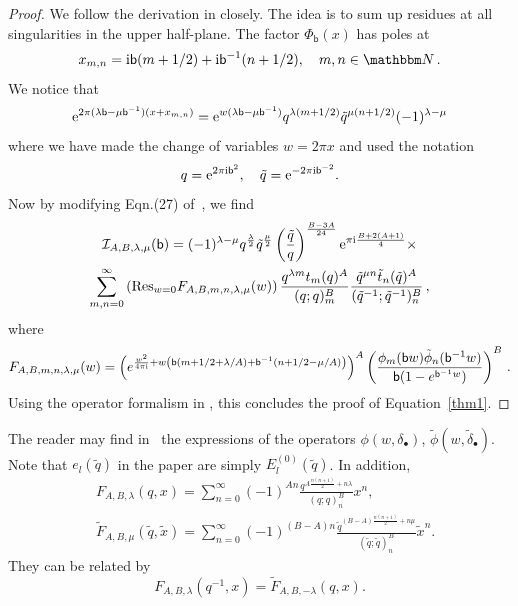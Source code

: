 \documentclass[12pt,reqno]{amsart}
\theoremstyle{definition}
\def\BN{\mathbbm N}
\def\calI{\mathcal I}
\def\calI{\mathcal I}
\def\tq{\tilde{q}}
\def\Res{\mathrm{Res}}
\def\bb{\mathsf{b}}
\def\ri{\mathrm{i}}
\def\wt{\widetilde}
\def\tx{\tilde{x}}
\def\re{{\rm e}}
\def\ri{{\rm i}}
\begin{document}
  \begin{proof}
  We follow the derivation in \cite{GK:qseries} closely.
  The idea is to sum up residues at all singularities in the upper
  half-plane.  The factor $\Phi_{\bb}(x)$ has poles at
  \begin{equation}
    x_{m,n} = \ri\bb(m+1/2) + \ri\bb^{-1}(n+1/2),\quad m,n\in
    \BN \,.
  \end{equation}
  We notice that
  \begin{equation}
    \re^{2\pi(\lambda\bb - \mu\bb^{-1})(x+x_{m,n})} =
    \re^{w(\lambda\bb - \mu\bb^{-1})}
    q^{\lambda(m+1/2)}\tq^{\mu(n+1/2)}(-1)^{\lambda-\mu} 
  \end{equation}
  where we have made the change of variables $w = 2\pi x$ and used the
  notation
  \begin{equation}
    q = \re^{2\pi\ri \bb^2},\quad \tq = \re^{-2\pi\ri \bb^{-2}}.
  \end{equation}
  Now by modifying Eqn.(27) of~\cite{GK:qseries}, we find
  \begin{multline}
    \calI_{A,B,\lambda,\mu}(\bb) =
    (-1)^{\lambda-\mu} q^{\frac{\lambda}{2}}\tq^{\frac{\mu}{2}}
    \left(\frac{\tq}{q}\right)^{\frac{B-3A}{24}}
    \re^{\pi\ri\frac{B+2(A+1)}{4}} \times \\
    \sum_{m,n=0}^\infty \left(\Res_{w = 0}F_{A,B,m,n,\lambda,\mu}(w)\right)
    \frac{q^{\lambda m}t_m(q)^A}{(q;q)_m^B}
    \frac{\tq^{\mu n}\tilde{t}_n(\tq)^A}{(\tq^{-1};\tq^{-1})_n^B} \,,
  \end{multline}
  where
  \begin{equation}
    F_{A,B,m,n,\lambda,\mu}(w) =
    \left(e^{\frac{w^2}{4\pi\ri}+w\left(\bb(m+1/2
          +\lambda/A)+\bb^{-1}(n+1/2-\mu/A)\right)}
    \right)^A
    \left(\frac{\phi_m(\bb w)\tilde{\phi}_n(\bb^{-1}w)}
      {\bb(1-e^{\bb^{-1}w})}\right)^B \,.
  \end{equation}
  Using the operator formalism in \cite{GK:qseries}, this concludes
  the proof of Equation~\eqref{thm1}.
\end{proof}

  The reader may find in~\cite{GK:qseries} the expressions of the operators
  $\phi(w,\delta_\bullet)$, $\tilde{\phi}(w,\tilde{\delta}_\bullet)$.
  Note that $e_l(\tq)$ in the paper are simply $E_l^{(0)}(\tq)$.
  In addition,
  \begin{align}
    &F_{A,B,\lambda}(q,x) = \sum_{n=0}^\infty (-1)^{A n}
      \frac{q^{A\frac{n(n+1)}{2}+n\lambda}}{(q;q)_n^B} x^n,\\
    &\wt{F}_{A,B,\mu}(\tq,\tx) = \sum_{n=0}^\infty (-1)^{(B-A) n}
      \frac{\tq^{(B-A)\frac{n(n+1)}{2}+n\mu}}{(\tq;\tq)_n^B} \tx^n.
  \end{align}
  They can be related by
  \begin{equation}
    F_{A,B,\lambda}(q^{-1},x) = \wt{F}_{A,B,-\lambda}(q,x).
  \end{equation}
\end{document}
